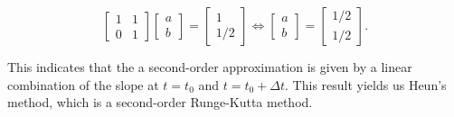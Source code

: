 \documentclass[11pt,titlepage]{report}
\begin{document}
\begin{appendices}
\begin{equation}
	\begin{bmatrix}
		1 & 1 \\
		0 & 1 
	\end{bmatrix} \begin{bmatrix}
		a \\
		b 
	\end{bmatrix} = \begin{bmatrix}
		1 \\
		1/2
	\end{bmatrix} \Leftrightarrow \begin{bmatrix}
		a \\
		b
	\end{bmatrix} = \begin{bmatrix}
		1/2 \\ 
		1/2
	\end{bmatrix}.
\end{equation}

This indicates that the a second-order approximation is given by a linear combination of the slope at $t=t_0$ and $t=t_0+\Delta t$. This result yields us Heun's method, which is a second-order Runge-Kutta method. 

\end{appendices}
\end{document}
